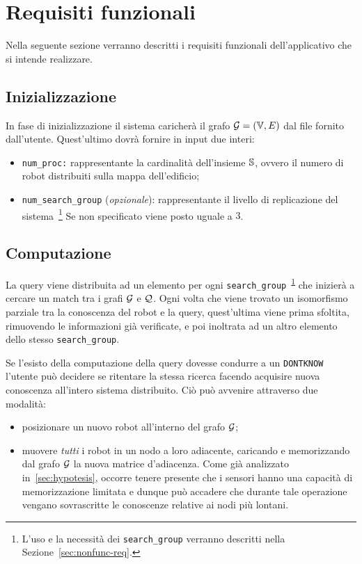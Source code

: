 \documentclass{llncs}
\begin{document}
\section{Requisiti funzionali}
Nella seguente sezione verranno descritti i requisiti funzionali
dell'applicativo che si intende realizzare.

\subsection{Inizializzazione}
In fase di inizializzazione il sistema caricherà il grafo $\mathcal{G} = ( \mathbb{V}, E)$ dal file
fornito dall'utente. Quest'ultimo dovrà fornire in input due interi:
\begin{itemize}
\item \texttt{num\_proc:} rappresentante la cardinalità dell'insieme $\mathbb{S}$, ovvero il numero di
robot distribuiti sulla mappa dell'edificio;
\item \texttt{num\_search\_group} (\emph{opzionale}): rappresentante
  il livello di replicazione del sistema~\footnote{\label{fn:searchgroup}
    L'uso e la necessità dei \texttt{search\_group} verranno descritti
    nella Sezione~\ref*{sec:nonfunc-req}.} Se non specificato viene posto uguale a $3$.
\end{itemize}

\subsection{Computazione}
\label{sec:computation}
La query viene distribuita ad un elemento per ogni \texttt{search\_group}~\textsuperscript{\ref{fn:searchgroup}}
che inizierà a cercare un match tra i grafi $\mathcal{G}$ e $\mathcal{Q}$. Ogni volta che viene trovato un isomorfismo
parziale tra la conoscenza del robot e la query, quest'ultima viene prima sfoltita, rimuovendo
le informazioni già verificate, e poi inoltrata ad
un altro elemento dello stesso \texttt{search\_group}.

Se l'esisto della computazione della query dovesse condurre a un \texttt{DONTKNOW}
l'utente può decidere se ritentare la stessa ricerca facendo acquisire nuova conoscenza
all'intero sistema distribuito. Ciò può avvenire attraverso due modalità:
\begin{itemize}
	\item posizionare un nuovo robot all'interno del grafo $\mathcal{G}$;
	\item muovere \emph{tutti} i robot in un nodo a loro adiacente, caricando e memorizzando
	  dal grafo $\mathcal{G}$ la nuova matrice d'adiacenza.
          Come già analizzato in~\ref{sec:hypotesis},
          occorre tenere presente che i sensori hanno
	una capacità di memorizzazione limitata e dunque può accadere che durante
	tale operazione vengano sovrascritte le conoscenze relative ai nodi più lontani.
\end{itemize}
\end{document}
